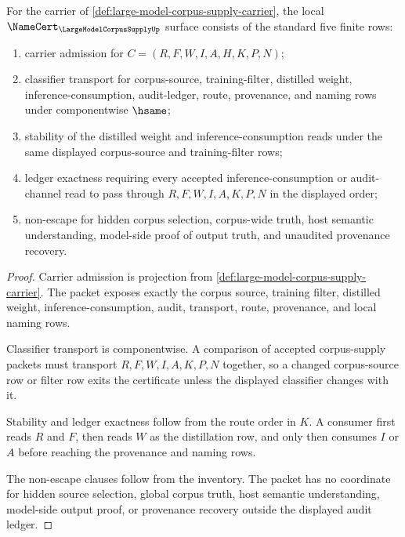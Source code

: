\begin{theorem}
\label{thm:large-model-corpus-supply-namecert-obligations}
For the carrier of \autoref{def:large-model-corpus-supply-carrier}, the local $\NameCert_{\LargeModelCorpusSupplyUp}$ surface consists of the standard five finite rows:
\begin{enumerate}
\item carrier admission for $C=(R,F,W,I,A,H,K,P,N)$;
\item classifier transport for corpus-source, training-filter, distilled weight, inference-consumption, audit-ledger, route, provenance, and naming rows under componentwise $\hsame$;
\item stability of the distilled weight and inference-consumption reads under the same displayed corpus-source and training-filter rows;
\item ledger exactness requiring every accepted inference-consumption or audit-channel read to pass through $R,F,W,I,A,K,P,N$ in the displayed order;
\item non-escape for hidden corpus selection, corpus-wide truth, host semantic understanding, model-side proof of output truth, and unaudited provenance recovery.
\end{enumerate}
\end{theorem}
\begin{proof}
Carrier admission is projection from \autoref{def:large-model-corpus-supply-carrier}. The packet exposes exactly the corpus source, training filter, distilled weight, inference-consumption, audit, transport, route, provenance, and local naming rows.

Classifier transport is componentwise. A comparison of accepted corpus-supply packets must transport $R,F,W,I,A,K,P,N$ together, so a changed corpus-source row or filter row exits the certificate unless the displayed classifier changes with it.

Stability and ledger exactness follow from the route order in $K$. A consumer first reads $R$ and $F$, then reads $W$ as the distillation row, and only then consumes $I$ or $A$ before reaching the provenance and naming rows.

The non-escape clauses follow from the inventory. The packet has no coordinate for hidden source selection, global corpus truth, host semantic understanding, model-side output proof, or provenance recovery outside the displayed audit ledger.
\end{proof}


